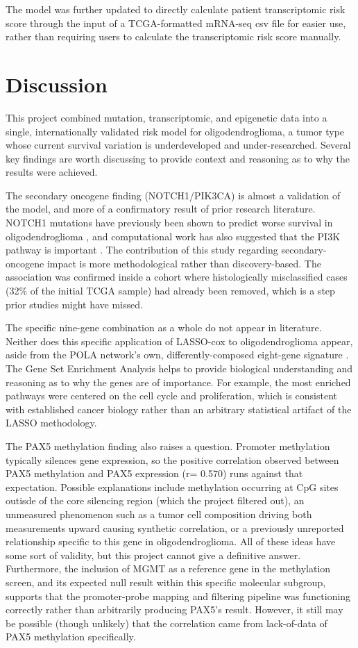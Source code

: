 \documentclass[11pt, letterpaper]{article}
\begin{document}
The model was further updated to directly calculate patient transcriptomic risk score through the input of a TCGA-formatted mRNA-seq csv file for easier use, rather than requiring users to calculate the transcriptomic risk score manually.

\section{Discussion}

This project combined mutation, transcriptomic, and epigenetic data into a single, internationally validated risk model for oligodendroglioma, a tumor type whose current survival variation is underdeveloped and under-researched. Several key findings are worth discussing to provide context and reasoning as to why the results were achieved.

The secondary oncogene finding (NOTCH1/PIK3CA) is almost a validation of the model, and more of a confirmatory result of prior research literature. NOTCH1 mutations have previously been shown to predict worse survival in oligodendroglioma \cite{Aoki2018}, and computational work has also suggested that the PI3K pathway is important \cite{CancerGenomeAtlas2015}. The contribution of this study regarding secondary-oncogene impact is more methodological rather than discovery-based. The association was confirmed inside a cohort where histologically misclassified cases (32\% of the initial TCGA sample) had already been removed, which is a step prior studies might have missed. 

The specific nine-gene combination as a whole do not appear in literature. Neither does this specific application of LASSO-cox to oligodendroglioma appear, aside from the POLA network's own, differently-composed eight-gene signature \cite{Bertucci2023}. The Gene Set Enrichment Analysis helps to provide biological understanding and reasoning as to why the genes are of importance. For example, the most enriched pathways were centered on the cell cycle and proliferation, which is consistent with established cancer biology rather than an arbitrary statistical artifact of the LASSO methodology.

The PAX5 methylation finding also raises a question. Promoter methylation typically silences gene expression, so the positive correlation observed between PAX5 methylation and PAX5 expression (r= 0.570) runs against that expectation. Possible explanations include methylation occurring at CpG sites outisde of the core silencing region (which the project filtered out), an unmeasured phenomenon such as a tumor cell composition driving both measurements upward causing synthetic correlation, or a previously unreported relationship specific to this gene in oligodendroglioma. All of these ideas have some sort of validity, but this project cannot give a definitive answer. Furthermore, the inclusion of MGMT as a reference gene in the methylation screen, and its expected null result within this specific molecular subgroup, supports that the promoter-probe mapping and filtering pipeline was functioning correctly rather than arbitrarily producing PAX5's result. However, it still may be possible (though unlikely) that the correlation came from lack-of-data of PAX5 methylation specifically.
\end{document}
